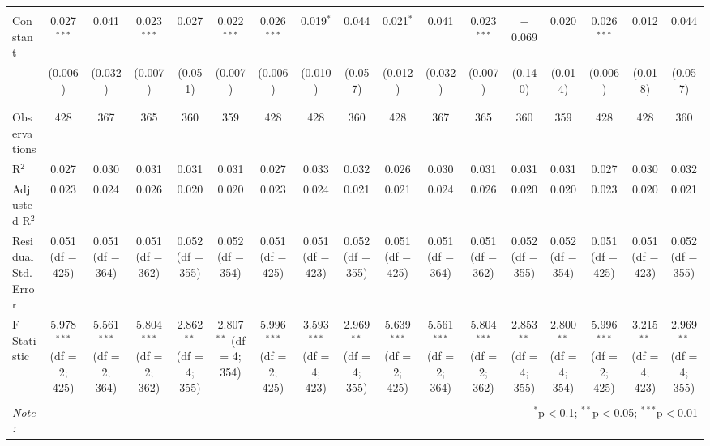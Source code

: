 \begin{table}[!htbp]
\begin{tabular}{@{\extracolsep{5pt}}lcccccccccccccccc}
  & & & & & & & & & & & & & & & & \\ 
 Constant & 0.027$^{***}$ & 0.041 & 0.023$^{***}$ & 0.027 & 0.022$^{***}$ & 0.026$^{***}$ & 0.019$^{*}$ & 0.044 & 0.021$^{*}$ & 0.041 & 0.023$^{***}$ & $-$0.069 & 0.020 & 0.026$^{***}$ & 0.012 & 0.044 \\ 
  & (0.006) & (0.032) & (0.007) & (0.051) & (0.007) & (0.006) & (0.010) & (0.057) & (0.012) & (0.032) & (0.007) & (0.140) & (0.014) & (0.006) & (0.018) & (0.057) \\ 
  & & & & & & & & & & & & & & & & \\ 
\hline \\[-1.8ex] 
Observations & 428 & 367 & 365 & 360 & 359 & 428 & 428 & 360 & 428 & 367 & 365 & 360 & 359 & 428 & 428 & 360 \\ 
R$^{2}$ & 0.027 & 0.030 & 0.031 & 0.031 & 0.031 & 0.027 & 0.033 & 0.032 & 0.026 & 0.030 & 0.031 & 0.031 & 0.031 & 0.027 & 0.030 & 0.032 \\ 
Adjusted R$^{2}$ & 0.023 & 0.024 & 0.026 & 0.020 & 0.020 & 0.023 & 0.024 & 0.021 & 0.021 & 0.024 & 0.026 & 0.020 & 0.020 & 0.023 & 0.020 & 0.021 \\ 
Residual Std. Error & 0.051 (df = 425) & 0.051 (df = 364) & 0.051 (df = 362) & 0.052 (df = 355) & 0.052 (df = 354) & 0.051 (df = 425) & 0.051 (df = 423) & 0.052 (df = 355) & 0.051 (df = 425) & 0.051 (df = 364) & 0.051 (df = 362) & 0.052 (df = 355) & 0.052 (df = 354) & 0.051 (df = 425) & 0.051 (df = 423) & 0.052 (df = 355) \\ 
F Statistic & 5.978$^{***}$ (df = 2; 425) & 5.561$^{***}$ (df = 2; 364) & 5.804$^{***}$ (df = 2; 362) & 2.862$^{**}$ (df = 4; 355) & 2.807$^{**}$ (df = 4; 354) & 5.996$^{***}$ (df = 2; 425) & 3.593$^{***}$ (df = 4; 423) & 2.969$^{**}$ (df = 4; 355) & 5.639$^{***}$ (df = 2; 425) & 5.561$^{***}$ (df = 2; 364) & 5.804$^{***}$ (df = 2; 362) & 2.853$^{**}$ (df = 4; 355) & 2.800$^{**}$ (df = 4; 354) & 5.996$^{***}$ (df = 2; 425) & 3.215$^{**}$ (df = 4; 423) & 2.969$^{**}$ (df = 4; 355) \\ 
\hline 
\hline \\[-1.8ex] 
\textit{Note:}  & \multicolumn{16}{r}{$^{*}$p$<$0.1; $^{**}$p$<$0.05; $^{***}$p$<$0.01} \\ 
\end{tabular} 
\end{table} 
